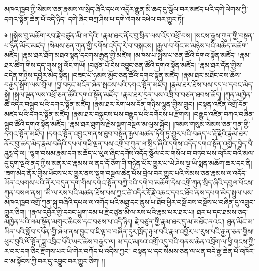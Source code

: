 \documentclass{article}
\begin{document}
མཁའ་ཁྱབ་ཀྱི་སེམས་ཅན་རྣམས་ལ་སྲིད་ཞིའི་དཔལ་འབྱོར་རྒྱུན་མི་ཆད་དུ་སྩོལ་བར་མཛད་པའི་དགེ་ལེགས་ཀྱི་དགའ་སྟོན་ཆེན་པོ་འདི་ཉིད། དགེ་ཞིང་བཀྲ་ཤིས་པ་དགེ་ལེགས་འཕེལ་བར་གྱུར་ཏོ།།

༈ །།སྐྱེས་བུ་མཆོག་རབ་རྗེ་བཙུན་མི་ལ་དེའི། །རྣམ་ཐར་ནོར་བུ་ཕྲིན་ལས་འོད་འཕྲོ་བས། །སངས་རྒྱས་ཀུན་གྱི་བསྟན་པ་ཉིན་མོར་མཛད། །སེམས་ཅན་ཀུན་གྱི་དགོས་འདོད་རེ་བ་བསྐངས། །རྒྱལ་བ་གོང་མ་མཉེས་པའི་མཆོད་མཆོག་མཛོད། །རྣམ་ཐར་ཐོག་མཐའ་སྙན་དངགས་རྒྱན་གྱི་མཛེས། །མཁས་པ་སྤྲོས་པ་ཅན་ཚོའི་དགའ་སྟོན་མཛོད། །རྣམ་ཐར་ཚིག་གིས་དད་གུས་སྤུ་ལོང་གཡོ། །བཙུན་པོ་ངེས་འབྱུང་ཅན་ཚོའི་དགའ་སྟོན་མཛོད། །རྣམ་ཐར་དོན་གྱིས་བདེན་གཉིས་དབྱེར་མེད་སྟོན། །བཟང་པོ་ཉམས་མྱོང་ཅན་ཚོའི་དགའ་སྟོན་མཛོད། །རྣམ་ཐར་མཐོང་བས་ཆོས་བརྒྱད་སྒྲོག་ལས་གྲོལ། །བྱ་བཏང་མངོན་ཞེན་སྤངས་པའི་དགའ་སྟོན་མཛོད། །རྣམ་ཐར་ཐོས་པས་དད་པ་དབང་མེད་སྐྱེ། །སྐལ་ལྡན་ལས་འཕྲོ་ཅན་ཚོའི་དགའ་སྟོན་མཛོད། །རྣམ་ཐར་དྲན་པས་འཁྲི་བ་བཙན་ཐབས་ཆོད། །ཀུན་མཁྱེན་ཚེ་འདིར་བསྒྲུབ་པའི་དགའ་སྟོན་མཛོད། །རྣམ་ཐར་རེག་པས་དོན་གཉིས་ལྷུན་གྱིས་གྲུབ། །བསྟན་འཛིན་འགྲོ་དོན་མཛད་པའི་དགའ་སྟོན་མཛོད། །རྣམ་ཐར་བསྐྱངས་པས་བརྒྱུད་པའི་དགོངས་པ་རྫོགས། །བརྒྱུད་འཛིན་བཀའ་བཞིན་སྒྲུབ་ཚོའི་དགའ་སྟོན་མཛོད། །རྣམ་ཐར་ཐུགས་རྗེས་སྡུག་བསྔལ་མ་ལུས་སྐྱོབ། །ཁམས་གསུམ་སེམས་ཅན་ཀུན་གྱི་དགའ་སྟོན་མཛོད། །དགའ་སྟོན་འབྱུང་གནས་ཐུབ་བསྟན་རྒྱལ་མཚན་ཏོག་ཏུ་གྱུར་པའི་བཞད་པ་རྡོ་རྗེའི་རྣམ་ཐར་ནོར་བུ་ཚད་མེད་རྣམ་བཞིའི་དཔལ་གཟི་ལྡན་པས་འགྲོ་བ་ཀུན་ལ་སྲིད་ཞིའི་དགོས་འདོད་དགའ་སྟོན་འགྱེད་བྱེད་བཻ་ཌཱུརྻ་དེ་ལ། །ལྷག་བསམ་རྣམ་དག་མཆོད་པ་ཕུལ་ཞིང་དགོས་འདོད་སྩོལ་བར་གསོལ་བ་བཏབ་པས་འཁོར་བའི་མལ་དུ་དུག་ལྔའི་ནད་ཀྱིས་མནར་བ་རྣམས་ལ་ནད་དོ་ཅོག་གི་གཉེན་པོར་གྱུར་པ་ཡེ་ཤེས་ལྔ་ཡི་སྨན་མཆོག་ཆར་དང་ནི། །ཟག་མེད་ནོར་གྱིས་ཕོངས་པར་གྱུར་ནས་སྡུག་བསྔལ་ཆེན་པོས་བྲེལ་བར་གྱུར་པའི་སེམས་ཅན་རྣམས་ལ་འདོད་ཡོན་འཕགས་པའི་ནོར་བདུན་དག་གིས་དགའ་སྟོན་བཀྱེ་བའི་དགེ་བ་མཆོག་དེས་འགྲོ་ཀུན་སྲིད་ཞིའི་དབུལ་ཕོངས་ཀུན་བསལ་ནས། །མི་ལ་རས་པའི་མཚན་ཐོས་པས་ཀྱང་ཚེ་འདིར་རྡོ་རྗེ་འཆང་དབང་ཐོབ་ནས་དཔག་མེད་སྤྲུལ་པས་མཁའ་ཁྱབ་འགྲོ་ཀུན་སྐུ་བཞིའི་དཔལ་ལ་འགོད་པའི་མཐུ་དང་ནུས་པ་ཐོབ་ཕྱིར་བསྔོ་བས་བསྔོས་པ་བཞིན་དུ་འགྲུབ་གྱུར་ཅིག། །།རྣལ་འབྱོར་གྱི་དབང་ཕྱུག་དམ་པ་རྗེ་བཙུན་མི་ལ་རས་པའི་རྣམ་པར་ཐར་པ། ཐར་པ་དང་ཐམས་ཅད་མཁྱེན་པའི་ལམ་སྟོན་མགུར་ཆིངས་དང་བཅས་པ་འདི་ཉིད། རྗེ་བཙུན་གྱི་རྣམ་ཐར་དུ་མ་མཐོང་ནའང་། ཐུན་མོང་མ་ཡིན་པའི་སློབ་དཔོན་གྱི་ཞལ་ནས་བྱུང་བ་ཇི་ལྟ་བ་བཞིན་དུར་ཁྲོད་ཉུལ་བའི་རྣལ་འབྱོར་པ་རུས་པའི་རྒྱན་ཅན་གྱིས། ཕུར་བུའི་ལོ་སྟོན་ཟླ་འབྲིང་པོའི་ཡར་ཚེས་བརྒྱད་ལ། མ་དང་མཁའ་འགྲོ་འདུ་བའི་གནས་ཆེན་འབྲོག་ལ་ཕྱི་གངས་ཀྱི་ར་བར་དག་ཅིང་རྫོགས་པར་ཡི་གེར་བཀོད་པ་འདིས་ཀྱང་། བསྟན་པ་དང་སེམས་ཅན་ལ་ཕན་བདེ་རྒྱ་ཆེན་པོ་འཁོར་བ་མ་སྟོངས་ཀྱི་བར་དུ་འབྱུང་བར་གྱུར་ཅིག། །།
\end{document}
